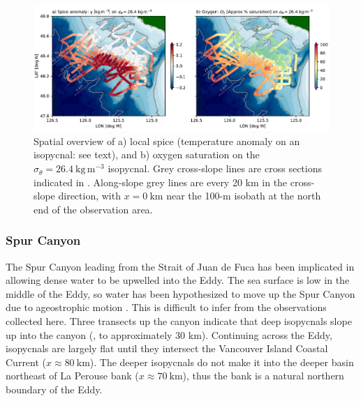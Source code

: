 \documentclass[draft]{agujournal2019}
\newcommand*{\Eddy}{{\sc Eddy}}
\begin{document}
\begin{figure}[htbp]
  \begin{center}
    \includegraphics[width=6.2in]{SpiceO2264}
    \caption{Spatial overview of a) local spice (temperature anomaly on an isopycnal: see text), and b) oxygen saturation on the $\sigma_{\theta} = 26.4\ \mathrm{kg\,m^{-3}}$ isopycnal.  Grey cross-slope lines are cross sections indicated in .  Along-slope grey lines are every 20 km in the cross-slope direction, with $x=0\ \mathrm{km}$ near the 100-m isobath at the north end of the observation area.
   \label{fig:SpiceO2264}
    }
  \end{center}
\end{figure}

\subsubsection{Spur Canyon}

The Spur Canyon leading from the Strait of Juan de Fuca has been implicated in allowing dense water to be upwelled into the \Eddy.  The sea surface is low in the middle of the \Eddy, so water has been hypothesized to move up the Spur Canyon due to ageostrophic motion \cite{weaverhsieh87,freelanddenman82}.  This is difficult to infer from the observations collected here.  Three transects up the canyon indicate that deep isopycnals slope up into the canyon (, to approximately 30 km).  Continuing across the \Eddy, isopycnals are largely flat until they intersect the Vancouver Island Coastal Current ($x\approx 80\ \mathrm{km}$).  The deeper isopycnals do not make it into the deeper basin northeast of La Perouse bank ($x\approx 70\ \mathrm{km}$),  thus the bank is a natural northern boundary of the \Eddy.
\end{document}
